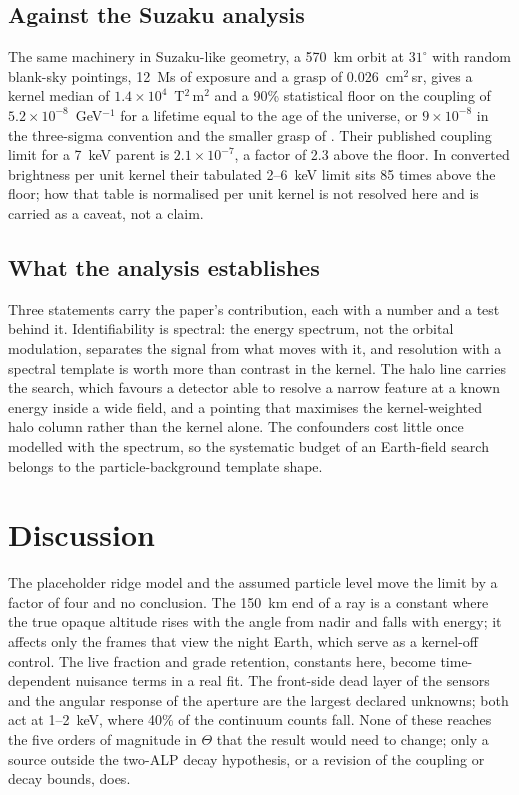 \documentclass[11pt]{article}
\newcommand{\Th}{\Theta}
\begin{document}
\subsection{Against the Suzaku analysis}

The same machinery in Suzaku-like geometry, a 570~km orbit at $31^\circ$ with random blank-sky pointings, 12~Ms of exposure and a grasp of 0.026~cm$^2$\,sr, gives a kernel median of $1.4\times10^{4}$~T$^2$\,m$^2$ and a 90\% statistical floor on the coupling of $5.2\times10^{-8}$~GeV$^{-1}$ for a lifetime equal to the age of the universe, or $9\times10^{-8}$ in the three-sigma convention and the smaller grasp of \citet{yamamoto2020alp}. Their published coupling limit for a 7~keV parent is $2.1\times10^{-7}$, a factor of 2.3 above the floor. In converted brightness per unit kernel their tabulated 2--6~keV limit sits 85 times above the floor; how that table is normalised per unit kernel is not resolved here and is carried as a caveat, not a claim.

\subsection{What the analysis establishes}

Three statements carry the paper's contribution, each with a number and a test behind it. Identifiability is spectral: the energy spectrum, not the orbital modulation, separates the signal from what moves with it, and resolution with a spectral template is worth more than contrast in the kernel. The halo line carries the search, which favours a detector able to resolve a narrow feature at a known energy inside a wide field, and a pointing that maximises the kernel-weighted halo column rather than the kernel alone. The confounders cost little once modelled with the spectrum, so the systematic budget of an Earth-field search belongs to the particle-background template shape.

\section{Discussion}
\label{sec:discussion}

The placeholder ridge model and the assumed particle level move the limit by a factor of four and no conclusion. The 150~km end of a ray is a constant where the true opaque altitude rises with the angle from nadir and falls with energy; it affects only the frames that view the night Earth, which serve as a kernel-off control. The live fraction and grade retention, constants here, become time-dependent nuisance terms in a real fit. The front-side dead layer of the sensors and the angular response of the aperture are the largest declared unknowns; both act at 1--2~keV, where 40\% of the continuum counts fall. None of these reaches the five orders of magnitude in $\Th$ that the result would need to change; only a source outside the two-ALP decay hypothesis, or a revision of the coupling or decay bounds, does.
\end{document}

